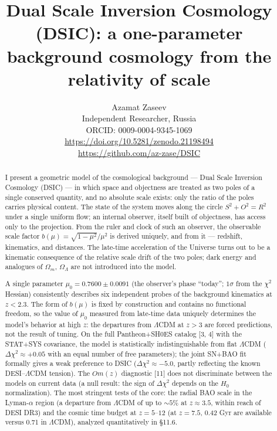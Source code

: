 \documentclass{article}
\begin{document}
\title{Dual Scale Inversion Cosmology (DSIC): a one-parameter background cosmology from the relativity of scale}

\author{Azamat Zaseev\\
Independent Researcher, Russia\\
ORCID: 0009-0004-9345-1069\\
\url{https://doi.org/10.5281/zenodo.21198494}\\
\url{https://github.com/az-zase/DSIC}}

\date{}
\maketitle

\begin{abstract}
I present a geometric model of the cosmological background --- Dual Scale Inversion Cosmology (DSIC) --- in which space and objectness are treated as two poles of a single conserved quantity, and no absolute scale exists: only the ratio of the poles carries physical content. The state of the system moves along the circle $S^2 + O^2 = R^2$ under a single uniform flow; an internal observer, itself built of objectness, has access only to the projection. From the ruler and clock of such an observer, the observable scale factor $b(\mu) = \sqrt{1-\mu^2}/\mu^2$ is derived uniquely, and from it --- redshift, kinematics, and distances. The late-time acceleration of the Universe turns out to be a kinematic consequence of the relative scale drift of the two poles; dark energy and analogues of $\Omega_m$, $\Omega_\Lambda$ are not introduced into the model.

A single parameter $\mu_0 = 0.7600 \pm 0.0091$ (the observer's phase ``today''; $1\sigma$ from the $\chi^2$ Hessian) consistently describes six independent probes of the background kinematics at $z < 2.3$. The form of $b(\mu)$ is fixed by construction and contains no functional freedom, so the value of $\mu_0$ measured from late-time data uniquely determines the model's behavior at high $z$: the departures from $\Lambda$CDM at $z > 3$ are forced predictions, not the result of tuning. On the full Pantheon+SH0ES catalog [3, 4] with the STAT+SYS covariance, the model is statistically indistinguishable from flat $\Lambda$CDM ($\Delta\chi^2 \approx +0.05$ with an equal number of free parameters); the joint SN+BAO fit formally gives a weak preference to DSIC ($\Delta\chi^2 \approx -5.0$, partly reflecting the known DESI--$\Lambda$CDM tension). The $Om(z)$ diagnostic [11] does not discriminate between the models on current data (a null result: the sign of $\Delta\chi^2$ depends on the $H_0$ normalization). The most stringent tests of the core: the radial BAO scale in the Lyman-$\alpha$ region (a departure from $\Lambda$CDM of up to ${\sim}5\%$ at $z \approx 3.5$, within reach of DESI DR3) and the cosmic time budget at $z = 5\text{--}12$ (at $z = 7.5$, 0.42 Gyr are available versus 0.71 in $\Lambda$CDM), analyzed quantitatively in \S11.6.


\end{abstract}
\end{document}

